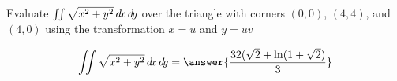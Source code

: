 \documentclass{ximera}
\author{David Guichard \and Neal Koblitz \and H. Jerome Keisler \and Albert Scheller \and Barry Balof \and Mike Wills \and Matthew Carr}
\begin{document}
\begin{exercise}




Evaluate $\iint \sqrt{x^2+y^2} \mathop{}\!d\! x \mathop{}\!d\! y$ over the triangle with corners $(0,0)$, $(4,4)$, and $(4,0)$ using the transformation $x=u$ and $y=uv$

\begin{prompt}
\[
\iint \sqrt{x^2+y^2} \d x \d y=\answer{\frac{32(\sqrt{2}+\ln(1+\sqrt{2})}{3}}
\]
\end{prompt}



\end{exercise}
\end{document}
